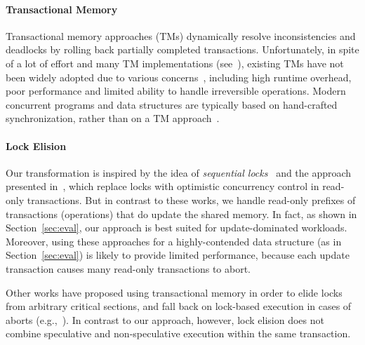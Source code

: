 \paragraph{Transactional Memory}
Transactional memory approaches (TMs) dynamically resolve inconsistencies
and deadlocks by rolling back partially completed transactions.
%
Unfortunately, in spite of a lot of effort and many TM implementations (see~\cite{HLR:SLCA2010}), existing TMs
have not been widely adopted due to various concerns~\cite{DuffyTM2010,Cascaval:2008,mckenneyParallel}, including high runtime overhead,
poor performance and limited ability to handle irreversible operations.
Modern concurrent programs and data structures are typically based on hand-crafted synchronization, rather than  on a TM approach~\cite{Ohad:OOPSLA11}.



\paragraph{Lock Elision}
Our transformation is inspired by the idea of \emph{sequential locks}~\cite{mckenneyParallel} and the approach presented in~\cite{Nakaike:2010}, which replace locks with optimistic concurrency control in read-only transactions.
But  in contrast to these works,  
we handle read-only prefixes of transactions (operations) that do update the shared memory. In fact,
as shown in Section~\ref{sec:eval}, our approach is best suited for update-dominated workloads.
Moreover, using these approaches for a highly-contended data structure (as in Section~\ref{sec:eval}) is likely to provide limited performance,
because each update transaction causes many read-only transactions to abort.

Other works have proposed using transactional memory in order 
to elide locks from arbitrary critical sections, and fall back on lock-based execution in cases of aborts (e.g.,~\cite{Rajwar:2002:TLE:635508.605399,Roy:2009:RSS:1519065.1519094,Afek:2014:SHL:2611462.2611482}).
In contrast to our approach, however, lock elision does not combine speculative and non-speculative execution within 
the same transaction.






